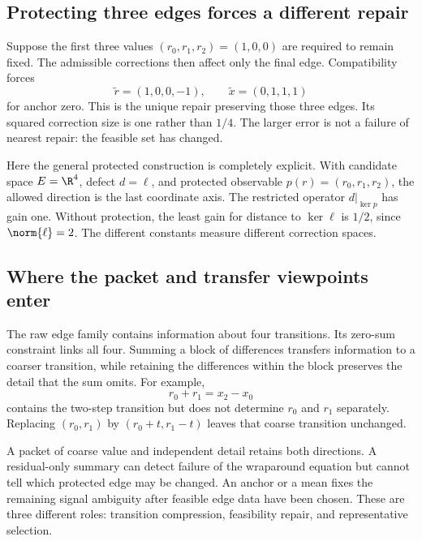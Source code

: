 
\subsection{Protecting three edges forces a different repair}
Suppose the first three values \((r_0,r_1,r_2)=(1,0,0)\) are required to remain fixed. The admissible corrections then affect only the final edge. Compatibility forces
\[
 \widetilde r=(1,0,0,-1),\qquad
 \widetilde x=(0,1,1,1)
\]
for anchor zero. This is the unique repair preserving those three edges. Its squared correction size is one rather than \(1/4\). The larger error is not a failure of nearest repair: the feasible set has changed.

Here the general protected construction is completely explicit. With candidate space \(E=\R^4\), defect \(d=\ell\), and protected observable \(p(r)=(r_0,r_1,r_2)\), the allowed direction is the last coordinate axis. The restricted operator \(d|_{\ker p}\) has gain one. Without protection, the least gain for distance to \(\ker\ell\) is \(1/2\), since \(\norm{\ell}=2\). The different constants measure different correction spaces.

\subsection{Where the packet and transfer viewpoints enter}
The raw edge family contains information about four transitions. Its zero-sum constraint links all four. Summing a block of differences transfers information to a coarser transition, while retaining the differences within the block preserves the detail that the sum omits. For example,
\[
 r_0+r_1=x_2-x_0
\]
contains the two-step transition but does not determine \(r_0\) and \(r_1\) separately. Replacing \((r_0,r_1)\) by \((r_0+t,r_1-t)\) leaves that coarse transition unchanged.

A packet of coarse value and independent detail retains both directions. A residual-only summary can detect failure of the wraparound equation but cannot tell which protected edge may be changed. An anchor or a mean fixes the remaining signal ambiguity after feasible edge data have been chosen. These are three different roles: transition compression, feasibility repair, and representative selection.

